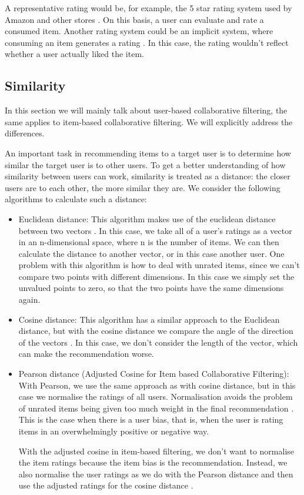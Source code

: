 A representative rating would be, for example, the 5 star rating system used by Amazon and other stores \cite{LU20121, miningOfMassiveDatasets}. On this basis, a user can evaluate and rate a consumed item. Another rating system could be an implicit system, where consuming an item generates a rating \cite{miningOfMassiveDatasets}. In this case, the rating wouldn't reflect whether a user actually liked the item.


\subsection{Similarity}

In this section we will mainly talk about user-based collaborative filtering, the same applies to item-based collaborative filtering. We will explicitly address the differences.

An important task in recommending items to a target user is to determine how similar the target user is to other users. To get a better understanding of how similarity between users can work, similarity is treated as a distance: the closer users are to each other, the more similar they are. We consider the following algorithms to calculate such a distance:

\begin{itemize}
    \item  Euclidean distance: This algorithm makes use of the euclidean distance between two vectors \cite{miningOfMassiveDatasets}. In this case, we take all of a user's ratings as a vector in an n-dimensional space, where n is the number of items. We can then calculate the distance to another vector, or in this case another user. One problem with this algorithm is how to deal with unrated items, since we can't compare two points with different dimensions. In this case we simply set the unvalued points to zero, so that the two points have the same dimensions again.

    \item Cosine distance: This algorithm has a similar approach to the Euclidean distance, but with the cosine distance we compare the angle of the direction of the vectors \cite{miningOfMassiveDatasets}. In this case, we don't consider the length of the vector, which can make the recommendation worse.

    \item Pearson distance (Adjusted Cosine for Item based Collaborative Filtering): With Pearson, we use the same approach as with cosine distance, but in this case we normalise the ratings of all users. Normalisation avoids the problem of unrated items being given too much weight in the final recommendation \cite{miningOfMassiveDatasets}. This is the case when there is a user bias, that is, when the user is rating items in an overwhelmingly positive or negative way.

With the adjusted cosine in item-based filtering, we don't want to normalise the item ratings because the item bias is the recommendation. Instead, we also normalise the user ratings as we do with the Pearson distance and then use the adjusted ratings for the cosine distance \cite{miningOfMassiveDatasets}.

\end{itemize}

